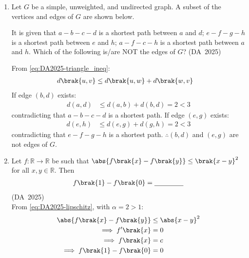 \begin{enumerate}[label=\thesubsection.\arabic*, ref=\thesubsection.\theenumi]
	\item 
	Let $G$ be a simple, unweighted, and undirected graph. A subset of the vertices and edges of $G$ are shown below.
	\begin{figure}[H]
		\centering
		
		\caption{}
		\label{fig:DA-2025-58}
	\end{figure}
	It is given that $a-b-c-d$ is a shortest path between $a$ and $d$; $e-f-g-h$ is a shortest path between $e$ and $h$; $a-f-c-h$ is a shortest path between $a$ and $h$. Which of the following is/are NOT the edges of $G$?
	\hfill (DA~2025)
	\begin{enumerate}
	\end{enumerate}
	\solution
	From \eqref{eq:DA2025-triangle_ineq}:
	\begin{align}
		d\brak{u, v} &\le d\brak{u, w} + d\brak{w, v}
	\end{align}
	If edge $(b, d)$ exists:
	\begin{align}
		d(a, d) &\le d(a, b) + d(b, d) = 2 < 3
	\end{align}
	contradicting that $a-b-c-d$ is a shortest path.
	If edge $(e, g)$ exists:
	\begin{align}
		d(e, h) &\le d(e, g) + d(g, h) = 2 < 3
	\end{align}
	contradicting that $e-f-g-h$ is a shortest path.
	$\therefore (b, d)$ and $(e, g)$ are not edges of $G$.
	
	\item 
	Let $f: \mathbb{R} \to \mathbb{R}$ be such that $\abs{f\brak{x} - f\brak{y}} \le \brak{x - y}^2$ for all $x, y \in \mathbb{R}$. Then
	\begin{align}
		f\brak{1} - f\brak{0} = \underline{\hspace{1.5cm}}
	\end{align}
	\hfill (DA~2025)
	\\
	\solution
	From \eqref{eq:DA2025-lipschitz}, with $\alpha = 2 > 1$:
	\begin{align}
		\abs{f\brak{x} - f\brak{y}} &\le \abs{x - y}^2
		\\
		\implies f'\brak{x} &= 0
		\\
		\implies f\brak{x} &= c
		\\
		\implies f\brak{1} - f\brak{0} &= 0
	\end{align}
	

\end{enumerate}
